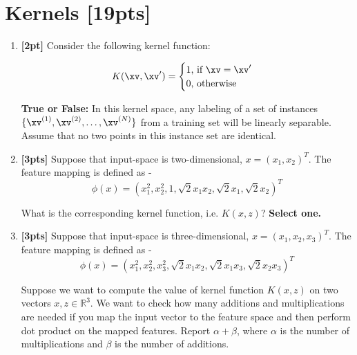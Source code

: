 \documentclass[12pt]{article}
\renewcommand{\circle}{\tikz\draw[black] (0,0) circle (1ex);}
\begin{document}
    \clearpage
    \section{Kernels [19pts]}
    \begin{enumerate}
    \item \textbf{[2pt]} Consider the following kernel function:

    \[K(\xv, \xv') = \begin{cases}{\text{1,  if } \xv = \xv'} \\{\text{0,  otherwise}}\end{cases}\]

    \textbf{True or False:} In this kernel space, any labeling of a set of instances $\{\xv^{(1)}, \xv^{(2)}, \ldots, \xv^{(N)} \}$ from a training set will be linearly separable. Assume that no two points in this instance set are identical.

    
    
    \item \textbf{[3pts]} Suppose that input-space is two-dimensional, \( x = (x_1, x_2)^T\). The feature mapping is defined as - \[\phi(x) = (x_1^2, x_2^2, 1, \sqrt{2}x_1x_2, \sqrt{2}x_1,\sqrt{2}x_2)^T\]
    
    What is the corresponding kernel function, i.e. \(K(x,z)\)? \textbf{Select one.}

    
    
    \item \textbf{[3pts]} Suppose that input-space is three-dimensional, \( x = (x_1, x_2, x_3)^T\). The feature mapping is defined as - \[\phi(x) = (x_1^2, x_2^2, x_3^2, \sqrt{2}x_1x_2, \sqrt{2}x_1x_3,\sqrt{2}x_2x_3)^T\]

    Suppose we want to compute the value of kernel function \(K(x,z)\) on two vectors \(x,z \in {\mathbb{R}}^3\). We want to check how many additions and multiplications are needed if you map the input vector to the feature space and then perform dot product on the mapped features. Report \(\alpha + \beta\), where \(\alpha\) is the number of multiplications and \(\beta\) is the number of additions.


\end{enumerate}
\end{document}
